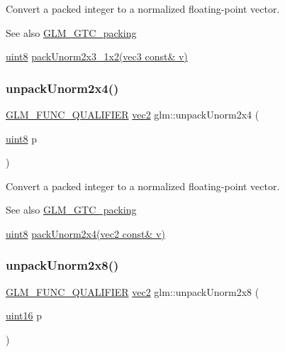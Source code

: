 Convert a packed integer to a normalized floating-\/point vector.

\begin{DoxySeeAlso}{See also}
\hyperlink{group__gtc__packing}{G\+L\+M\+\_\+\+G\+T\+C\+\_\+packing} 

\hyperlink{group__gtc__type__precision_ga1a7dcd8aac97cc8020817c94049deff2}{uint8} \hyperlink{group__gtc__packing_ga0acca4eb99c300fe2edeef7ebd8fa08b}{pack\+Unorm2x3\+\_\+1x2(vec3 const\& v)} 
\end{DoxySeeAlso}
\mbox{\label{group__gtc__packing_ga3afb0452954320f2d83fe6f38cb24147}} 
\subsubsection{\texorpdfstring{unpack\+Unorm2x4()}{unpackUnorm2x4()}}
{\footnotesize\ttfamily \hyperlink{setup_8hpp_a33fdea6f91c5f834105f7415e2a64407}{G\+L\+M\+\_\+\+F\+U\+N\+C\+\_\+\+Q\+U\+A\+L\+I\+F\+I\+ER} \hyperlink{group__core__types_gaa1618f51db67eaa145db101d8c8431d8}{vec2} glm\+::unpack\+Unorm2x4 (\begin{DoxyParamCaption}\item[{\hyperlink{group__gtc__type__precision_ga1a7dcd8aac97cc8020817c94049deff2}{uint8}}]{p }\end{DoxyParamCaption})}

Convert a packed integer to a normalized floating-\/point vector.

\begin{DoxySeeAlso}{See also}
\hyperlink{group__gtc__packing}{G\+L\+M\+\_\+\+G\+T\+C\+\_\+packing} 

\hyperlink{group__gtc__type__precision_ga1a7dcd8aac97cc8020817c94049deff2}{uint8} \hyperlink{group__gtc__packing_gad68eb2f848ba867192b8787998c0595a}{pack\+Unorm2x4(vec2 const\& v)} 
\end{DoxySeeAlso}
\mbox{\label{group__gtc__packing_ga96ce0c24339ee676e28a027fffd1edf6}} 
\subsubsection{\texorpdfstring{unpack\+Unorm2x8()}{unpackUnorm2x8()}}
{\footnotesize\ttfamily \hyperlink{setup_8hpp_a33fdea6f91c5f834105f7415e2a64407}{G\+L\+M\+\_\+\+F\+U\+N\+C\+\_\+\+Q\+U\+A\+L\+I\+F\+I\+ER} \hyperlink{group__core__types_gaa1618f51db67eaa145db101d8c8431d8}{vec2} glm\+::unpack\+Unorm2x8 (\begin{DoxyParamCaption}\item[{\hyperlink{group__gtc__type__precision_gad8c2939e1fdd8e5828b31d95c52255d5}{uint16}}]{p }\end{DoxyParamCaption})}

